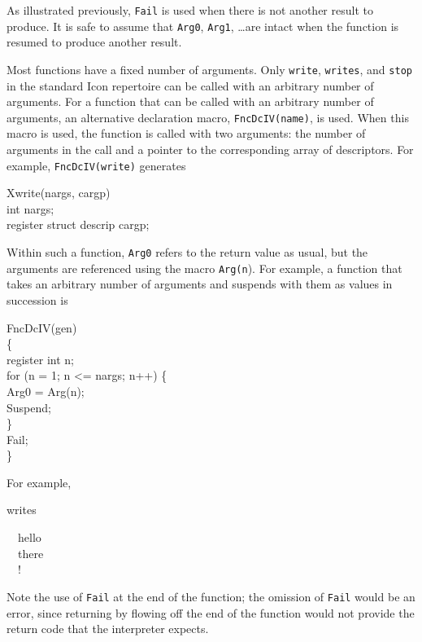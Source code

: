 \noindent
As illustrated previously, \texttt{Fail} is used when there is not another
result to produce. It is safe to assume that \texttt{Arg0}, \texttt{Arg1},
\ldots are intact when the function is resumed to produce another result.

Most functions have a fixed number of arguments. Only \texttt{write}, \texttt{writes},
and \texttt{stop} in the standard Icon repertoire can be called with an
arbitrary number of arguments. For a function that can be called with
an arbitrary number of arguments, an alternative declaration macro,
\texttt{FncDcIV(name)}, is used. When this macro is used, the function is
called with two arguments: the number of arguments in the call and a
pointer to the corresponding array of descriptors. For example,
\texttt{FncDcIV(write)} generates

\goodbreak
\begin{iconcode}
Xwrite(nargs, cargp)\\
int nargs;\\
register struct descrip cargp;
\end{iconcode}

Within such a function, \texttt{Arg0} refers to the return value as usual, but
the arguments are referenced using the macro \texttt{Arg(n}). For example, a
function that takes an arbitrary number of arguments and suspends with
them as values in succession is

\goodbreak
\begin{iconcode}
FncDcIV(gen)\\
\{\\
\>register int n;\\
\>for (n = 1; n <= nargs; n++) \{\\
\>\>Arg0 = Arg(n);\\
\>\>Suspend;\\
\>\}\\
\>Fail;\\
\}
\end{iconcode}

\noindent
For example,

\noindent
writes

\goodbreak
\begin{iconcode}
\ \ hello\\
\ \ there\\
\ \ !
\end{iconcode}

\noindent
Note the use of \texttt{Fail} at the end of the function; the omission of
\texttt{Fail} would be an error, since returning by flowing off the end of the
function would not provide the return code that the interpreter expects.

